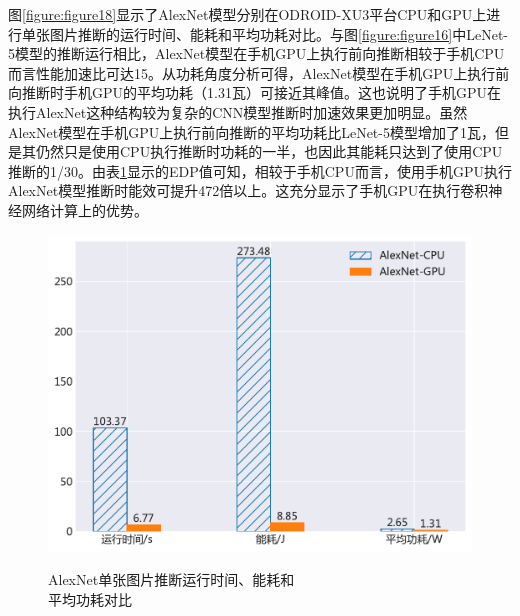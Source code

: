 图\ref{figure:figure18}显示了AlexNet模型分别在ODROID-XU3平台CPU和GPU上进行单张图片推断的运行时间、能耗和平均功耗对比。与图\ref{figure:figure16}中LeNet-5模型的推断运行相比，AlexNet模型在手机GPU上执行前向推断相较于手机CPU而言性能加速比可达15。从功耗角度分析可得，AlexNet模型在手机GPU上执行前向推断时手机GPU的平均功耗（1.31瓦）可接近其峰值。这也说明了手机GPU在执行AlexNet这种结构较为复杂的CNN模型推断时加速效果更加明显。虽然AlexNet模型在手机GPU上执行前向推断的平均功耗比LeNet-5模型增加了1瓦，但是其仍然只是使用CPU执行推断时功耗的一半，也因此其能耗只达到了使用CPU推断的1/30。由表\ref{table:table8}显示的EDP值可知，相较于手机CPU而言，使用手机GPU执行AlexNet模型推断时能效可提升472倍以上。这充分显示了手机GPU在执行卷积神经网络计算上的优势。

\begin{figure}[htbp]
\begin{minipage}[b]{.6\linewidth}
    \begin{center}
    \includegraphics[height=0.65\textwidth]{figures/alexnet_energy.pdf}
    \end{center}
    \caption{AlexNet单张图片推断运行时间、能耗和 \\ 平均功耗对比}\label{figure:figure18}
\end{minipage}
\begin{minipage}[b]{.4\linewidth}
\centering
{}
\label{table:table8}
\end{minipage}
\end{figure}

